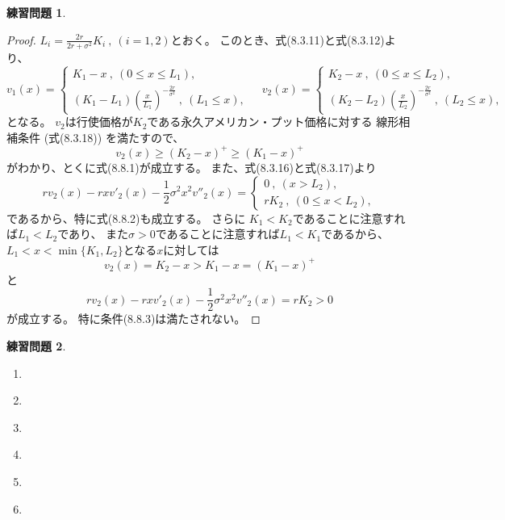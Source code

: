 \documentclass[uplatex]{jsarticle}
\theoremstyle{definition}
\newtheorem{prob}[prob]{練習問題}
\begin{document}
\begin{prob}\label{prob: 8.2}
\end{prob}

\begin{proof}
  \(L_i = \frac{2r}{2r+\sigma^2}K_i \ , \ (i=1,2)\)とおく。
  このとき、式(8.3.11)と式(8.3.12)より、
  \[
  v_1(x) =
  \begin{cases}
    K_1-x \ , \ (0\leq x \leq L_1), \\
    (K_1-L_1)\left( \frac{x}{L_1}\right)^{-\frac{2r}{\sigma^2}} \ , \ (L_1\leq x),
  \end{cases}
  \ \ \ \ \
  v_2(x) =
  \begin{cases}
    K_2-x \ , \ (0\leq x \leq L_2), \\
    (K_2-L_2)\left( \frac{x}{L_2}\right)^{-\frac{2r}{\sigma^2}} \ , \ (L_2\leq x),
  \end{cases}
  \]
  となる。
  \(v_2\)は行使価格が\(K_2\)である永久アメリカン・プット価格に対する
  線形相補条件 (式(8.3.18)) を満たすので、
  \[
  v_2(x) \geq (K_2-x)^+ \geq (K_1-x)^+
  \]
  がわかり、とくに式(8.8.1)が成立する。
  また、式(8.3.16)と式(8.3.17)より
  \[
  rv_2(x) - rxv'_2(x) - \frac{1}{2}\sigma^2x^2v''_2(x) =
  \begin{cases}
    0 \ , \ (x > L_2), \\
    rK_2 \ , \ (0\leq x < L_2),
  \end{cases}
  \]
  であるから、特に式(8.8.2)も成立する。
  さらに
  \(K_1 < K_2\)であることに注意すれば\(L_1 < L_2\)であり、
  また\(\sigma > 0\)であることに注意すれば\(L_1 < K_1\)であるから、
  \(L_1 < x < \min\{ K_1, L_2\}\)となる\(x\)に対しては
  \[
  v_2(x) = K_2 - x > K_1 - x = ( K_1-x )^+
  \]
  と
  \[
  rv_2(x) - rxv'_2(x) - \frac{1}{2}\sigma^2x^2v''_2(x) = rK_2 > 0
  \]
  が成立する。
  特に条件(8.8.3)は満たされない。
\end{proof}








\begin{prob}\label{prob: 8.3}
  \begin{enumerate}
    \item \label{enumi: 8.3-1}
    \item \label{enumi: 8.3-2}
    \item \label{enumi: 8.3-3}
    \item \label{enumi: 8.3-4}
    \item \label{enumi: 8.3-5}
    \item \label{enumi: 8.3-6}
  \end{enumerate}
\end{prob}
\end{document}
